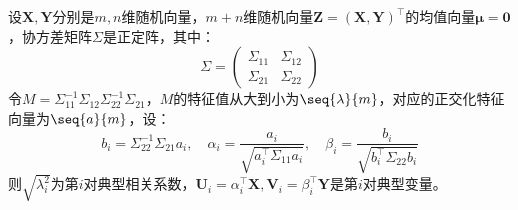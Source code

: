 \begin{theorem}
	设$\mathbf{X},\mathbf{Y}$分别是$m,n$维随机向量，$m+n$维随机向量$\mathbf{Z}=(\mathbf{X},\mathbf{Y})^{\top}$的均值向量$\boldsymbol{\mu}=\mathbf{0}$，协方差矩阵$\Sigma$是正定阵，其中：
	\begin{equation*}
		\Sigma=
		\begin{pmatrix}
			\Sigma_{11} & \Sigma_{12} \\
			\Sigma_{21} & \Sigma_{22}
		\end{pmatrix}
	\end{equation*}
	令$M=\Sigma_{11}^{-1}\Sigma_{12}\Sigma_{22}^{-1}\Sigma_{21}$，$M$的特征值从大到小为$\seq{\lambda}{m}$，对应的正交化特征向量为$\seq{a}{m}$，设：
	\begin{equation*}
		b_i=\Sigma_{22}^{-1}\Sigma_{21}a_i,\quad\alpha_i=\frac{a_i}{\sqrt{a_i^{\top}\Sigma_{11}a_i}},\quad\beta_i=\frac{b_i}{\sqrt{b_i^{\top}\Sigma_{22}b_i}}
	\end{equation*}
	则$\sqrt{\lambda_i^2}$为第$i$对典型相关系数，$\mathbf{U}_i=\alpha_i^{\top}\mathbf{X},\mathbf{V}_i=\beta_i^{\top}\mathbf{Y}$是第$i$对典型变量。
\end{theorem}
